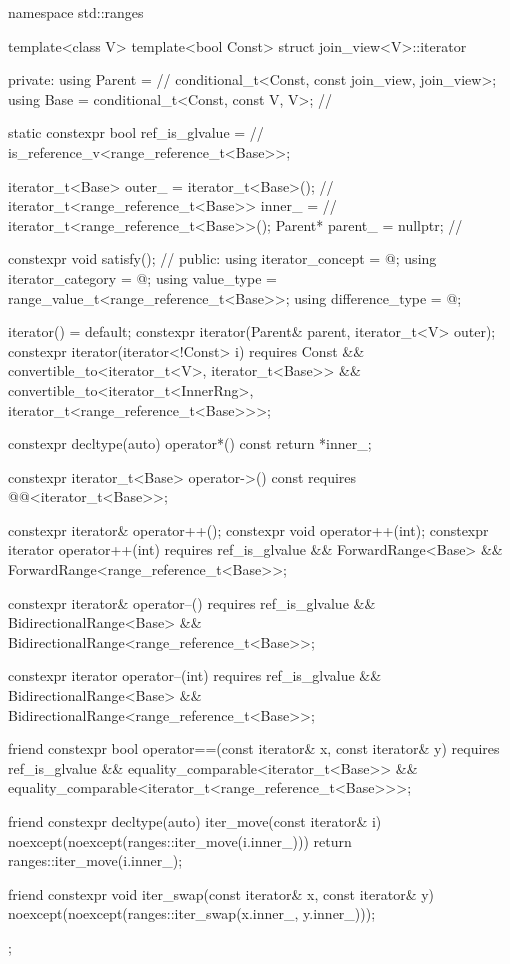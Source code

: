 \pnum
\begin{codeblock}
namespace std::ranges {
template<class V>
  template<bool Const>
  struct join_view<V>::iterator {
  private:
    using Parent =                                              // \expos
      conditional_t<Const, const join_view, join_view>;
    using Base   = conditional_t<Const, const V, V>;            // \expos

    static constexpr bool ref_is_glvalue =                      // \expos
      is_reference_v<range_reference_t<Base>>;

    iterator_t<Base> outer_ = iterator_t<Base>();               // \expos
    iterator_t<range_reference_t<Base>> inner_ =                // \expos
      iterator_t<range_reference_t<Base>>();
    Parent* parent_ = nullptr;                                  // \expos

    constexpr void satisfy();                                   // \expos
  public:
    using iterator_concept  = @\seebelow@;
    using iterator_category = @\seebelow@;
    using value_type        = range_value_t<range_reference_t<Base>>;
    using difference_type   = @\seebelow@;

    iterator() = default;
    constexpr iterator(Parent& parent, iterator_t<V> outer);
    constexpr iterator(iterator<!Const> i)
      requires Const &&
               convertible_to<iterator_t<V>, iterator_t<Base>> &&
               convertible_to<iterator_t<InnerRng>,
                              iterator_t<range_reference_t<Base>>>;

    constexpr decltype(auto) operator*() const { return *inner_; }

    constexpr iterator_t<Base> operator->() const
      requires @@<iterator_t<Base>>;

    constexpr iterator& operator++();
    constexpr void operator++(int);
    constexpr iterator operator++(int)
      requires ref_is_glvalue && ForwardRange<Base> &&
               ForwardRange<range_reference_t<Base>>;

    constexpr iterator& operator--()
      requires ref_is_glvalue && BidirectionalRange<Base> &&
               BidirectionalRange<range_reference_t<Base>>;

    constexpr iterator operator--(int)
      requires ref_is_glvalue && BidirectionalRange<Base> &&
               BidirectionalRange<range_reference_t<Base>>;

    friend constexpr bool operator==(const iterator& x, const iterator& y)
      requires ref_is_glvalue && equality_comparable<iterator_t<Base>> &&
               equality_comparable<iterator_t<range_reference_t<Base>>>;

    friend constexpr decltype(auto) iter_move(const iterator& i)
    noexcept(noexcept(ranges::iter_move(i.inner_))) {
      return ranges::iter_move(i.inner_);
    }

    friend constexpr void iter_swap(const iterator& x, const iterator& y)
      noexcept(noexcept(ranges::iter_swap(x.inner_, y.inner_)));
  };
}
\end{codeblock}

